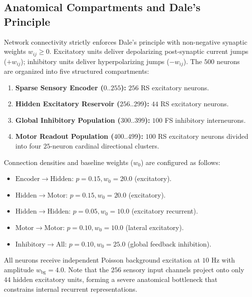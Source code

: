 \documentclass[journal]{IEEEtran}
\begin{document}
\subsection{Anatomical Compartments and Dale's Principle}
Network connectivity strictly enforces Dale's principle with non-negative synaptic weights $w_{ij} \ge 0$. Excitatory units deliver depolarizing post-synaptic current jumps ($+w_{ij}$); inhibitory units deliver hyperpolarizing jumps ($-w_{ij}$). The $500$ neurons are organized into five structured compartments:
\begin{enumerate}
    \item \textbf{Sparse Sensory Encoder ($0..255$):} $256$ RS excitatory neurons.
    \item \textbf{Hidden Excitatory Reservoir ($256..299$):} $44$ RS excitatory neurons.
    \item \textbf{Global Inhibitory Population ($300..399$):} $100$ FS inhibitory interneurons.
    \item \textbf{Motor Readout Population ($400..499$):} $100$ RS excitatory neurons divided into four $25$-neuron cardinal directional clusters.
\end{enumerate}
Connection densities and baseline weights ($w_0$) are configured as follows:
\begin{itemize}
    \item $\mathrm{Encoder} \to \mathrm{Hidden}$: $p = 0.15, w_0 = 20.0$ (excitatory).
    \item $\mathrm{Hidden} \to \mathrm{Motor}$: $p = 0.15, w_0 = 20.0$ (excitatory).
    \item $\mathrm{Hidden} \to \mathrm{Hidden}$: $p = 0.05, w_0 = 10.0$ (excitatory recurrent).
    \item $\mathrm{Motor} \to \mathrm{Motor}$: $p = 0.10, w_0 = 10.0$ (lateral excitatory).
    \item $\mathrm{Inhibitory} \to \mathrm{All}$: $p = 0.10, w_0 = 25.0$ (global feedback inhibition).
\end{itemize}
All neurons receive independent Poisson background excitation at $10\text{ Hz}$ with amplitude $w_{\mathrm{bg}} = 4.0$. Note that the $256$ sensory input channels project onto only $44$ hidden excitatory units, forming a severe anatomical bottleneck that constrains internal recurrent representations.
\end{document}
